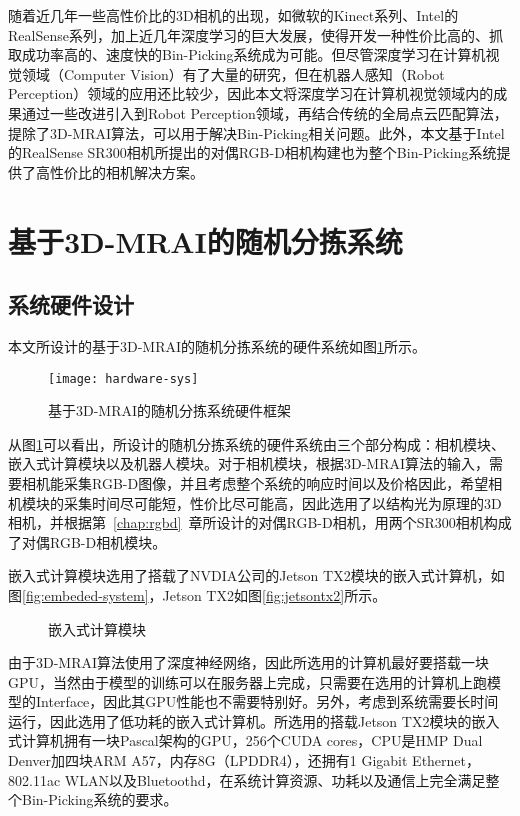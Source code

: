 随着近几年一些高性价比的3D相机的出现，如微软的Kinect系列、Intel的RealSense系列，加上近几年深度学习的巨大发展，使得开发一种性价比高的、抓取成功率高的、速度快的Bin-Picking系统成为可能。但尽管深度学习在计算机视觉领域（Computer Vision）有了大量的研究，但在机器人感知（Robot Perception）领域的应用还比较少，因此本文将深度学习在计算机视觉领域内的成果通过一些改进引入到Robot Perception领域，再结合传统的全局点云匹配算法，提除了3D-MRAI算法，可以用于解决Bin-Picking相关问题。此外，本文基于Intel的RealSense SR300相机所提出的对偶RGB-D相机构建也为整个Bin-Picking系统提供了高性价比的相机解决方案。

\section{基于3D-MRAI的随机分拣系统}
\subsection{系统硬件设计}
本文所设计的基于3D-MRAI的随机分拣系统的硬件系统如图\ref{fig:hardware-sys}所示。
\begin{figure}[ht]
  \centering
  \texttt{[image: hardware-sys]}
  \caption{基于3D-MRAI的随机分拣系统硬件框架}
  \label{fig:hardware-sys}
\end{figure}
从图\ref{fig:hardware-sys}可以看出，所设计的随机分拣系统的硬件系统由三个部分构成：相机模块、嵌入式计算模块以及机器人模块。对于相机模块，根据3D-MRAI算法的输入，需要相机能采集RGB-D图像，并且考虑整个系统的响应时间以及价格因此，希望相机模块的采集时间尽可能短，性价比尽可能高，因此选用了以结构光为原理的3D相机，并根据第~\ref{chap:rgbd}~章所设计的对偶RGB-D相机，用两个SR300相机构成了对偶RGB-D相机模块。

嵌入式计算模块选用了搭载了NVDIA公司的Jetson TX2模块的嵌入式计算机，如图\ref{fig:embeded-system}，Jetson TX2如图\ref{fig:jetsontx2}所示。
\begin{figure}[ht]
  \centering
  \vfill
  \caption{嵌入式计算模块}
\end{figure}
由于3D-MRAI算法使用了深度神经网络，因此所选用的计算机最好要搭载一块GPU，当然由于模型的训练可以在服务器上完成，只需要在选用的计算机上跑模型的Interface，因此其GPU性能也不需要特别好。另外，考虑到系统需要长时间运行，因此选用了低功耗的嵌入式计算机。所选用的搭载Jetson TX2模块的嵌入式计算机拥有一块Pascal架构的GPU，256个CUDA cores，CPU是HMP Dual Denver加四块ARM A57，内存8G（LPDDR4），还拥有1 Gigabit Ethernet，802.11ac WLAN以及Bluetoothd，在系统计算资源、功耗以及通信上完全满足整个Bin-Picking系统的要求。


